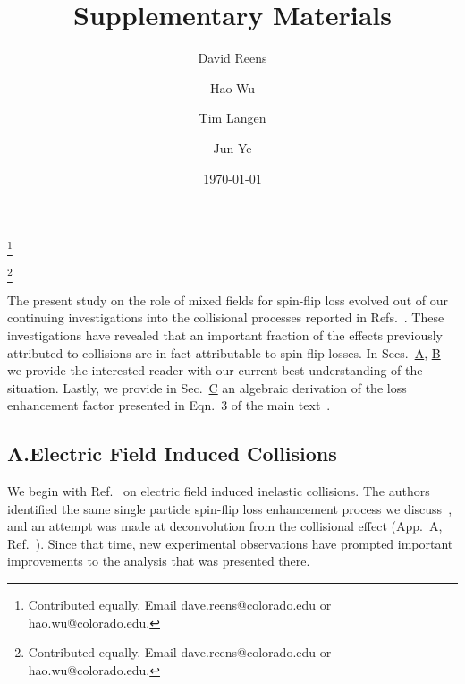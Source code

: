 \documentclass[%
 reprint,
 amsmath,amssymb,
 aps,
prl,
]{revtex4-1}
\begin{document}

\title{Supplementary Materials}%

\author{David Reens}
\thanks{Contributed equally. Email dave.reens@colorado.edu or hao.wu@colorado.edu.}

\author{Hao Wu}
\thanks{Contributed equally. Email dave.reens@colorado.edu or hao.wu@colorado.edu.}

\author{Tim Langen}%

\author{Jun Ye}


\date{\today}
\maketitle

\renewcommand{\thefigure}{S\arabic{figure}}
\setcounter{figure}{0}

\renewcommand{\thesubsection}{\alph{subsection}}
\setcounter{subsection}{3}


The present study on the role of mixed fields for spin-flip loss evolved out of our continuing investigations into the collisional processes reported in Refs.~\cite{Stuhl2013,Stuhl2012evap}.
These investigations have revealed that an important fraction of the effects previously attributed to collisions are in fact attributable to spin-flip losses.
In Secs.~\hyperref[sec:eic]{A}, \hyperref[sec:evap]{B} we provide the interested reader with our current best understanding of the situation.
Lastly, we provide in Sec.~\hyperref[sec:der]{C} an algebraic derivation of the loss enhancement factor presented in Eqn.~3 of the main text~\cite{smt}.

\subsection{A.\quad Electric Field Induced Collisions\label{sec:eic}}

We begin with Ref.~\cite{Stuhl2013} on electric field induced inelastic collisions. 
The authors identified the same single particle spin-flip loss enhancement process we discuss~\cite{smt}, and an attempt was made at deconvolution from the collisional effect (App.~A, Ref.~\cite{Stuhl2013}).
Since that time, new experimental observations have prompted important improvements to the analysis that was presented there.
\end{document}
